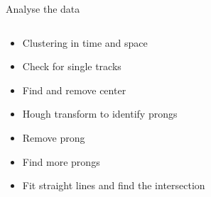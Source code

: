 \documentclass{beamer}
\begin{document}
\begin{frame}{\centering Analyse the data}
  \begin{columns}
    \begin{column}{0.45\textwidth}
      \begin{itemize}
      \item<1->{Clustering in time and space}
      \item<2->{Check for single tracks}
      \item<5->{Find and remove center}
      \item<7->{Hough transform to identify prongs}
      \item<8->{Remove prong}
      \item<9->{Find more prongs}
      \item<10>{Fit straight lines and find the intersection}
      \end{itemize}
    \end{column}
    \begin{column}{0.55\textwidth}
\end{column}
\end{columns}
\end{frame}
\end{document}
